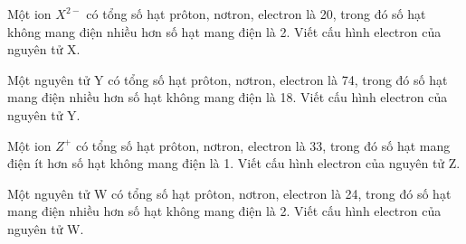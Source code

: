 \begin{bt}
	Một ion $X^{2-}$ có tổng số hạt prôton, nơtron, electron là 20, trong đó số hạt không mang điện nhiều hơn số hạt mang điện là 2. Viết cấu hình electron của nguyên tử X.
\end{bt}
\begin{bt}
	Một nguyên tử Y có tổng số hạt prôton, nơtron, electron là 74, trong đó số hạt mang điện nhiều hơn số hạt không mang điện là 18. Viết cấu hình electron của nguyên tử Y.
\end{bt}
\begin{bt}
	Một ion $Z^+$ có tổng số hạt prôton, nơtron, electron là 33, trong đó số hạt mang điện ít hơn số hạt không mang điện là 1. Viết cấu hình electron của nguyên tử Z.
\end{bt}
\begin{bt}
	Một nguyên tử W có tổng số hạt prôton, nơtron, electron là 24, trong đó số hạt mang điện nhiều hơn số hạt không mang điện là 2. Viết cấu hình electron của nguyên tử W.
\end{bt}
